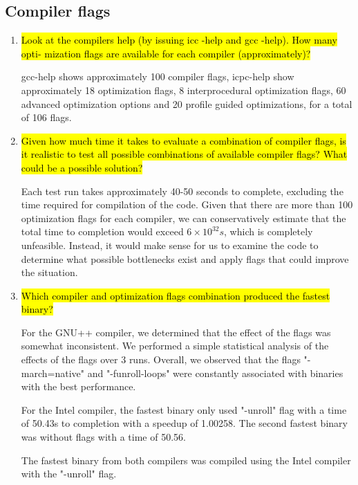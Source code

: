 \documentclass{article}
\begin{document}
\subsection{Compiler flags}
\begin{enumerate}
	\item \hl{Look at the compilers help (by issuing icc -help and gcc -help). How many opti-
	mization flags are available for each compiler (approximately)?}

	gcc-help shows approximately 100 compiler flags, icpc-help show approximately 18 optimization flags, 8 interprocedural optimization flags, 60 advanced optimization options and 20 profile guided optimizations, for a total of 106 flags.

	\item \hl{Given how much time it takes to evaluate a combination of compiler flags, is it realistic to test all possible combinations of available compiler flags? What could be a possible solution?}

	Each test run takes approximately 40-50 seconds to complete, excluding the time required for compilation of the code. Given that there are more than 100 optimization flags for each compiler, we can conservatively estimate that the total time to completion would exceed $6\times10^{32}s$, which is completely unfeasible. Instead, it would make sense for us to examine the code to determine what possible bottlenecks exist and apply flags that could improve the situation.

	\item \hl{Which compiler and optimization flags combination produced the fastest binary?}

	For the GNU++ compiler, we determined that the effect of the flags was somewhat inconsistent. We performed a simple statistical analysis of the effects of the flags over 3 runs. Overall, we observed that the flags "-march=native" and "-funroll-loops" were constantly associated with binaries with the best performance.

	For the Intel compiler, the fastest binary only used "-unroll" flag with a time of 50.43s to completion with a speedup of 1.00258. The second fastest binary was without flags with a time of 50.56.

	The fastest binary from both compilers was compiled using the Intel compiler with the "-unroll" flag.
\end{enumerate}
\end{document}
